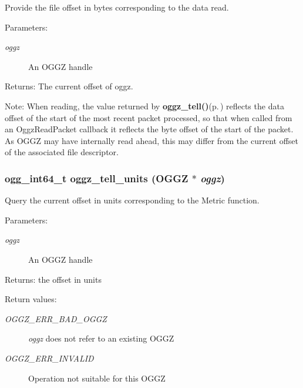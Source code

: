 Provide the file offset in bytes corresponding to the data read. 

\begin{Desc}
\item[Parameters:]
\begin{description}
\item[{\em oggz}]An OGGZ handle \end{description}
\end{Desc}
\begin{Desc}
\item[Returns:]The current offset of oggz.\end{Desc}
\begin{Desc}
\item[Note:]When reading, the value returned by {\bf oggz\_\-tell()}{\rm (p.\,\pageref{group__seek__api_ga7})} reflects the data offset of the start of the most recent packet processed, so that when called from an Oggz\-Read\-Packet callback it reflects the byte offset of the start of the packet. As OGGZ may have internally read ahead, this may differ from the current offset of the associated file descriptor. \end{Desc}
\subsubsection{\setlength{\rightskip}{0pt plus 5cm}ogg\_\-int64\_\-t oggz\_\-tell\_\-units ({\bf OGGZ} $\ast$ {\em oggz})}\label{group__seek__api_ga3}


Query the current offset in units corresponding to the Metric function. 

\begin{Desc}
\item[Parameters:]
\begin{description}
\item[{\em oggz}]An OGGZ handle \end{description}
\end{Desc}
\begin{Desc}
\item[Returns:]the offset in units \end{Desc}
\begin{Desc}
\item[Return values:]
\begin{description}
\item[{\em OGGZ\_\-ERR\_\-BAD\_\-OGGZ}]{\em oggz\/} does not refer to an existing OGGZ \item[{\em OGGZ\_\-ERR\_\-INVALID}]Operation not suitable for this OGGZ \end{description}
\end{Desc}
